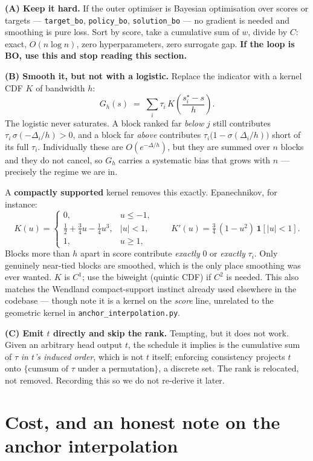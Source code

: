 \documentclass[11pt,a4paper]{article}
\newcommand{\ind}[1]{\mathbf{1}\!\left[#1\right]}
\newcommand{\sstar}{s^{\star}}
\theoremstyle{definition}
\begin{document}
\medskip
\noindent\textbf{(A) Keep it hard.} If the outer optimiser is Bayesian optimisation over scores or
targets --- \texttt{target\_bo}, \texttt{policy\_bo}, \texttt{solution\_bo} --- no gradient is
needed and smoothing is pure loss. Sort by score, take a cumulative sum of $w$, divide by $C$:
exact, $O(n \log n)$, zero hyperparameters, zero surrogate gap. \textbf{If the loop is BO, use
this and stop reading this section.}

\medskip
\noindent\textbf{(B) Smooth it, but not with a logistic.} Replace the indicator with a kernel CDF
$K$ of bandwidth $h$:
\[
  G_h(s) \;=\; \sum_i \tau_i\, K\!\left(\frac{\sstar_i - s}{h}\right).
\]
The logistic never saturates. A block ranked far \emph{below} $j$ still contributes
$\tau_i\,\sigma(-\Delta_i/h) > 0$, and a block far \emph{above} contributes
$\tau_i\big(1 - \sigma(\Delta_i/h)\big)$ short of its full $\tau_i$. Individually these are
$O(e^{-\Delta/h})$, but they are summed over $n$ blocks and they do not cancel, so $G_h$ carries a
systematic bias that grows with $n$ --- precisely the regime we are in.

A \textbf{compactly supported} kernel removes this exactly. Epanechnikov, for instance:
\[
  K(u) =
  \begin{cases}
    0, & u \le -1,\\[2pt]
    \tfrac12 + \tfrac34 u - \tfrac14 u^3, & |u| < 1,\\[2pt]
    1, & u \ge 1,
  \end{cases}
  \qquad
  K'(u) = \tfrac34\,(1-u^2)\,\ind{|u|<1}.
\]
Blocks more than $h$ apart in score contribute \emph{exactly} $0$ or \emph{exactly} $\tau_i$. Only
genuinely near-tied blocks are smoothed, which is the only place smoothing was ever wanted. $K$ is
$C^1$; use the biweight (quintic CDF) if $C^2$ is needed. This also matches the Wendland
compact-support instinct already used elsewhere in the codebase --- though note it is a kernel on
the \emph{score} line, unrelated to the geometric kernel in \texttt{anchor\_interpolation.py}.

\medskip
\noindent\textbf{(C) Emit $t$ directly and skip the rank.} Tempting, but it does not work. Given an
arbitrary head output $t$, the schedule it implies is the cumulative sum of $\tau$ \emph{in $t$'s
induced order}, which is not $t$ itself; enforcing consistency projects $t$ onto
$\{\text{cumsum of }\tau\text{ under a permutation}\}$, a discrete set. The rank is relocated, not
removed. Recording this so we do not re-derive it later.

\section{Cost, and an honest note on the anchor interpolation}
\end{document}
